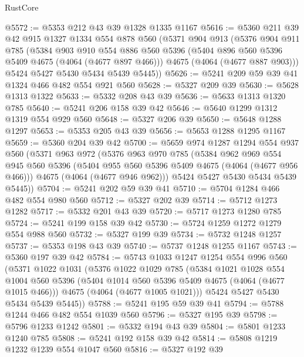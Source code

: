 \begin{lexlean}{RustCore}
\begin{coremodule}
@5572 := @5353 @212 @43 @39 @1328 @1335 @1167
@5616 := @5360
    @211
    @39
    @42
    @915
    @1327
    @1334
    @554
    @878
    @560
    (@5371
      @904
      @913
      (@5376
        @904
        @911
        @785
        (@5384
          @903
          @910
          @554
          @886
          @560
          @5396
          (@5404 @896 @560 @5396 @5409 @4675 (@4064 (@4677 @897 @466)))
          @4675
          (@4064 (@4677 @887 @903)))
        @5424
        @5427
        @5430
        @5434
        @5439
        @5445))
@5626 := @5241 @209 @59 @39 @41 @1324 @466 @482 @554 @921 @560
@5628 := @5327 @209 @39
@5630 := @5628 @1313 @1322
@5633 := @5332 @208 @43 @39
@5636 := @5633 @1313 @1320 @785
@5640 := @5241 @206 @158 @39 @42
@5646 := @5640 @1299 @1312 @1319 @554 @929 @560
@5648 := @5327 @206 @39
@5650 := @5648 @1288 @1297
@5653 := @5353 @205 @43 @39
@5656 := @5653 @1288 @1295 @1167
@5659 := @5360 @204 @39 @42
@5700 := @5659
    @974
    @1287
    @1294
    @554
    @937
    @560
    (@5371
      @963
      @972
      (@5376
        @963
        @970
        @785
        (@5384
          @962
          @969
          @554
          @945
          @560
          @5396
          (@5404 @955 @560 @5396 @5409 @4675 (@4064 (@4677 @956 @466)))
          @4675
          (@4064 (@4677 @946 @962)))
        @5424
        @5427
        @5430
        @5434
        @5439
        @5445))
@5704 := @5241 @202 @59 @39 @41
@5710 := @5704 @1284 @466 @482 @554 @980 @560
@5712 := @5327 @202 @39
@5714 := @5712 @1273 @1282
@5717 := @5332 @201 @43 @39
@5720 := @5717 @1273 @1280 @785
@5724 := @5241 @199 @158 @39 @42
@5730 := @5724 @1259 @1272 @1279 @554 @988 @560
@5732 := @5327 @199 @39
@5734 := @5732 @1248 @1257
@5737 := @5353 @198 @43 @39
@5740 := @5737 @1248 @1255 @1167
@5743 := @5360 @197 @39 @42
@5784 := @5743
    @1033
    @1247
    @1254
    @554
    @996
    @560
    (@5371
      @1022
      @1031
      (@5376
        @1022
        @1029
        @785
        (@5384
          @1021
          @1028
          @554
          @1004
          @560
          @5396
          (@5404 @1014 @560 @5396 @5409 @4675 (@4064 (@4677 @1015 @466)))
          @4675
          (@4064 (@4677 @1005 @1021)))
        @5424
        @5427
        @5430
        @5434
        @5439
        @5445))
@5788 := @5241 @195 @59 @39 @41
@5794 := @5788 @1244 @466 @482 @554 @1039 @560
@5796 := @5327 @195 @39
@5798 := @5796 @1233 @1242
@5801 := @5332 @194 @43 @39
@5804 := @5801 @1233 @1240 @785
@5808 := @5241 @192 @158 @39 @42
@5814 := @5808 @1219 @1232 @1239 @554 @1047 @560
@5816 := @5327 @192 @39

\end{coremodule}
\end{lexlean}
